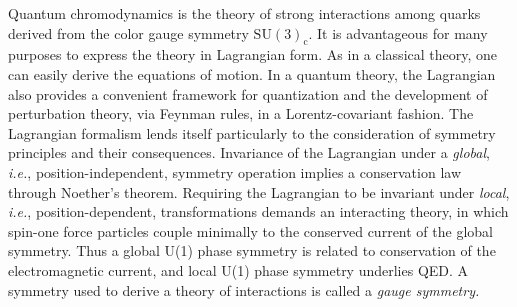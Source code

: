 \documentclass[11pt,prb,groupedaddress,nofootinbib,showpacs,floatfix]{revtex4-1}
\newcommand{\ie}{{\em i.e.}}
\newcommand{\cgg}{\ensuremath{\mathrm{SU(3)}_{\mathrm{c}}}}
\begin{document}
Quantum chromodynamics is the theory of strong interactions among
quarks derived from the color gauge symmetry \cgg. 
It is advantageous for many purposes to express the theory in 
Lagrangian form.
As in a classical theory, one can easily derive the equations of motion.
In a quantum theory, the Lagrangian also provides a convenient 
framework for quantization and the development of perturbation theory, 
via Feynman rules, in a Lorentz-covariant fashion.
The Lagrangian formalism lends itself particularly to the consideration
of symmetry principles and their consequences.
Invariance of the Lagrangian under a \emph{global}, \ie,
position-independent, symmetry operation implies a conservation law
through Noether's theorem.
Requiring the Lagrangian to be invariant under \emph{local}, \ie,
position-dependent, transformations demands an interacting theory, in
which spin-one force particles couple minimally to the conserved current
of the global symmetry.
Thus a global U(1) phase symmetry is related to conservation of the
electromagnetic current, and local U(1) phase symmetry underlies QED.
A symmetry used to derive a theory of interactions is called a
\emph{gauge symmetry.}
\end{document}
